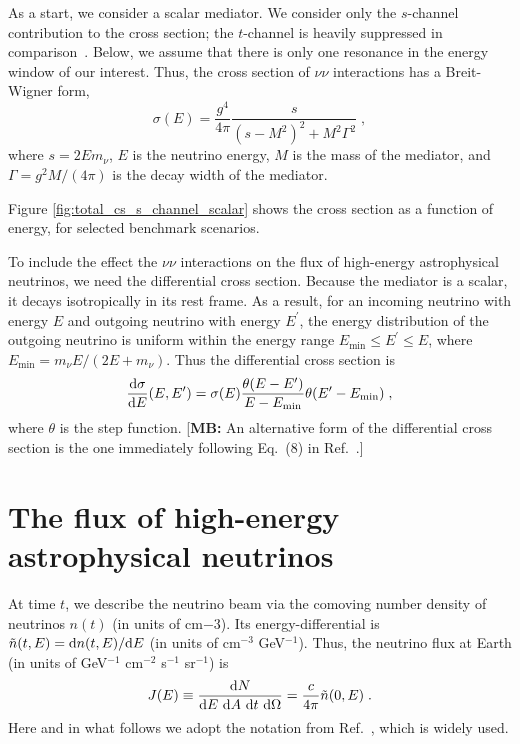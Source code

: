 \documentclass[aps,twocolumn,prd,showpacs,showkeys,preprintnumbers,superscriptaddress,nobibnotes,floatfix,longbibliography]{revtex4-1}
\newcommand{\Ref}{Ref.}
\newcommand{\MB}[1]{{\color{blue}[{\bf MB:} #1]}}
\begin{document}
As a start, we consider a scalar mediator.  We consider only the $s$-channel contribution to the cross section; the $t$-channel is heavily suppressed in comparison\ \cite{Ng:2014pca, Farzan:2014gza}.  Below, we assume that there is only one resonance in the energy window of our interest.  Thus, the cross section of $\nu \nu$ interactions has a Breit-Wigner form,
\begin{equation}
 \sigma(E)
 =
 \frac{g^4}{4\pi}
 \frac{s}{\left(s-M^2\right)^2+M^2\Gamma^2} \;,
\end{equation}
where $s = 2 E m_\nu$, $E$ is the neutrino energy, $M$ is the mass of the mediator, and $\Gamma = g^2 M / (4\pi)$ is the decay width of the mediator. 

Figure \ref{fig:total_cs_s_channel_scalar} shows the cross section as a function of energy, for selected benchmark scenarios.

To include the effect the $\nu \nu$ interactions on the flux of high-energy astrophysical neutrinos, we need the differential cross section.  Because the mediator is a scalar, it decays isotropically in its rest frame.  As a result, for an incoming neutrino with energy $E$ and outgoing neutrino with energy $E^\prime$, the energy distribution of the outgoing neutrino is uniform within the energy range $E_{\min} \leq E^\prime \leq E$, where $E_{\min} = m_\nu E / (2E+m_\nu)$.  Thus the differential cross section is
\begin{equation}
 \frac {{\rm d}\sigma} {{\rm d}E} (E, E^\prime)
 =
 \sigma(E)
 \frac { \theta(E-E^\prime) } { E-E_{\min} }
 \theta( E^\prime-E_{\min}) \;,
\end{equation}
where $\theta$ is the step function.  \MB{An alternative form of the differential cross section is the one immediately following Eq.~(8) in \Ref\ \cite{DiFranzo:2015qea}.}




\section{The flux of high-energy astrophysical neutrinos}

At time $t$, we describe the neutrino beam via the comoving number density of neutrinos $n(t)$ (in units of cm${-3}$).  Its energy-differential is $\tilde{n}(t, E) = {\rm d} n(t,E) / {\rm d} E$ (in units of cm$^{-3}$ GeV$^{-1}$).  Thus, the neutrino flux at Earth (in units of GeV$^{-1}$ cm$^{-2}$ s$^{-1}$ sr$^{-1}$) is
\begin{equation}
 J(E)
 \equiv
 \frac {{\rm d} N} {{\rm d}E ~{\rm d}A ~{\rm d}t ~{\rm d}\Omega}
 =
 \frac{c}{4\pi} \tilde{n}(0,E) \;.
\end{equation}
Here and in what follows we adopt the notation from \Ref\ \cite{Ng:2014pca}, which is widely used.
\end{document}
